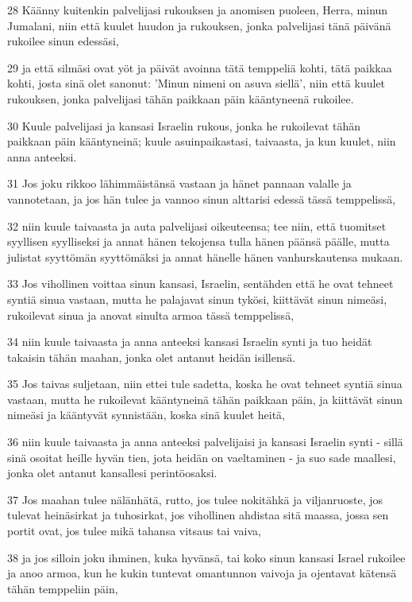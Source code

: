 \par 28 Käänny kuitenkin palvelijasi rukouksen ja anomisen puoleen, Herra, minun Jumalani, niin että kuulet huudon ja rukouksen, jonka palvelijasi tänä päivänä rukoilee sinun edessäsi,
\par 29 ja että silmäsi ovat yöt ja päivät avoinna tätä temppeliä kohti, tätä paikkaa kohti, josta sinä olet sanonut: 'Minun nimeni on asuva siellä', niin että kuulet rukouksen, jonka palvelijasi tähän paikkaan päin kääntyneenä rukoilee.
\par 30 Kuule palvelijasi ja kansasi Israelin rukous, jonka he rukoilevat tähän paikkaan päin kääntyneinä; kuule asuinpaikastasi, taivaasta, ja kun kuulet, niin anna anteeksi.
\par 31 Jos joku rikkoo lähimmäistänsä vastaan ja hänet pannaan valalle ja vannotetaan, ja jos hän tulee ja vannoo sinun alttarisi edessä tässä temppelissä,
\par 32 niin kuule taivaasta ja auta palvelijasi oikeuteensa; tee niin, että tuomitset syyllisen syylliseksi ja annat hänen tekojensa tulla hänen päänsä päälle, mutta julistat syyttömän syyttömäksi ja annat hänelle hänen vanhurskautensa mukaan.
\par 33 Jos vihollinen voittaa sinun kansasi, Israelin, sentähden että he ovat tehneet syntiä sinua vastaan, mutta he palajavat sinun tykösi, kiittävät sinun nimeäsi, rukoilevat sinua ja anovat sinulta armoa tässä temppelissä,
\par 34 niin kuule taivaasta ja anna anteeksi kansasi Israelin synti ja tuo heidät takaisin tähän maahan, jonka olet antanut heidän isillensä.
\par 35 Jos taivas suljetaan, niin ettei tule sadetta, koska he ovat tehneet syntiä sinua vastaan, mutta he rukoilevat kääntyneinä tähän paikkaan päin, ja kiittävät sinun nimeäsi ja kääntyvät synnistään, koska sinä kuulet heitä,
\par 36 niin kuule taivaasta ja anna anteeksi palvelijaisi ja kansasi Israelin synti - sillä sinä osoitat heille hyvän tien, jota heidän on vaeltaminen - ja suo sade maallesi, jonka olet antanut kansallesi perintöosaksi.
\par 37 Jos maahan tulee nälänhätä, rutto, jos tulee nokitähkä ja viljanruoste, jos tulevat heinäsirkat ja tuhosirkat, jos vihollinen ahdistaa sitä maassa, jossa sen portit ovat, jos tulee mikä tahansa vitsaus tai vaiva,
\par 38 ja jos silloin joku ihminen, kuka hyvänsä, tai koko sinun kansasi Israel rukoilee ja anoo armoa, kun he kukin tuntevat omantunnon vaivoja ja ojentavat kätensä tähän temppeliin päin,
